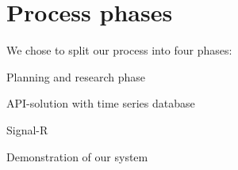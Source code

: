 \section{Process phases}

We chose to split our process into four phases:

Planning and research phase

API-solution with time series database

Signal-R

Demonstration of our system